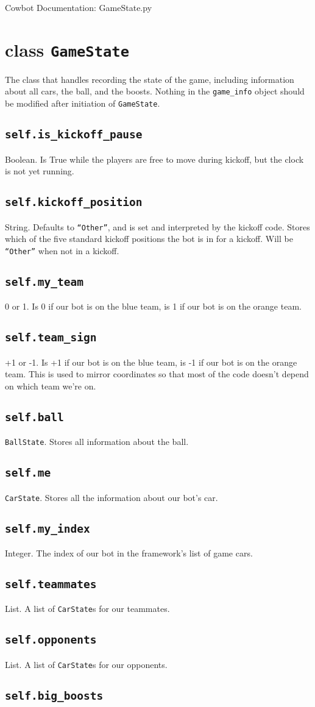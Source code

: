 \documentclass{article}
\newcommand{\class}[1]{\section{class \texttt{#1}}}
\newcommand{\attribute}[1]{\subsection{\texttt{self.#1}}}
\begin{document}
\begin{flushleft}

\begin{center}
  Cowbot Documentation: GameState.py
\end{center}

\class{GameState}
      {

        The class that handles recording the state of the game, including information about all cars, the ball, and the boosts.  Nothing in the \texttt{game\_info} object should be modified after initiation of \texttt{GameState}.



        \attribute{is\_kickoff\_pause}
                  {
                    Boolean.  Is True while the players are free to move during kickoff, but the clock is not yet running.
                  }
        \attribute{kickoff\_position}
                  {
                    String.  Defaults to \texttt{``Other''}, and is set and interpreted by the kickoff code.  Stores which of the five standard kickoff positions the bot is in for a kickoff.  Will be \texttt{``Other''} when not in a kickoff.
                  }
        \attribute{my\_team}
                  {
                    0 or 1.  Is 0 if our bot is on the blue team, is 1 if our bot is on the orange team.
                  }
        \attribute{team\_sign}
                  {
                    +1 or -1.  Is +1 if our bot is on the blue team, is -1 if our bot is on the orange team. This is used to mirror coordinates so that most of the code doesn't depend on which team we're on.
                  }
        \attribute{ball}
                  {
                    \texttt{BallState}.  Stores all information about the ball.
                  }
        \attribute{me}
                  {
                    \texttt{CarState}. Stores all the information about our bot's car.
                  }
        \attribute{my\_index}
                  {
                    Integer.  The index of our bot in the framework's list of game cars.
                  }
        \attribute{teammates}
                  {
                    List.  A list of \texttt{CarState}s for our teammates.
                  }
        \attribute{opponents}
                  {
                    List.  A list of \texttt{CarState}s for our opponents.                    
                  }
        \attribute{big\_boosts}
                  {
}}
\end{flushleft}
\end{document}
